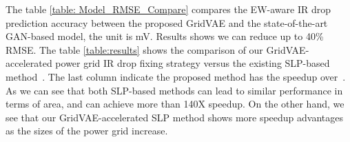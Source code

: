 \begin{table}[h]
	\begin{center} %
		\caption{ Comparison of the proposed VAE-accelerated SLP optimization method against the existing method}
		\label{table:results}
		\center
	\end{center}
	\vspace{-0.1in}
\end{table}
      The table \ref{table: Model_RMSE_Compare}  compares the EW-aware IR drop prediction accuracy between the proposed GridVAE and the state-of-the-art GAN-based model, the unit is mV. Results shows we can reduce up to 40\% RMSE. 
      The table \ref{table:results} shows the comparison of our GridVAE-accelerated power grid IR drop fixing strategy versus the existing SLP-based method~\cite{Sukharev:2019pg}. The last column indicate
      the proposed method has the speedup over~\cite{Sukharev:2019pg}.
      As we can see that both SLP-based
      methods can lead to similar performance in terms of area,  and can achieve more than 140X speedup.  On the other hand, we see that our GridVAE-accelerated SLP method shows more speedup advantages as the sizes of the power grid increase.
      








